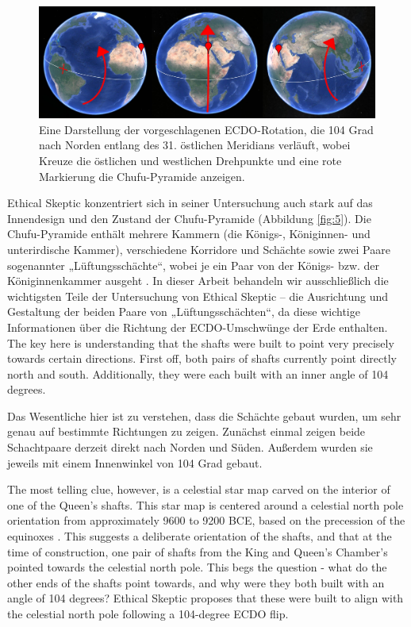 \documentclass[10pt,twocolumn,letterpaper]{article}
\begin{document}
\begin{figure}[b]
\begin{center}
\includegraphics[width=1\textwidth]{drawing.jpg}
\end{center}
   \caption{Eine Darstellung der vorgeschlagenen ECDO-Rotation, die 104 Grad nach Norden entlang des 31. östlichen Meridians verläuft, wobei Kreuze die östlichen und westlichen Drehpunkte und eine rote Markierung die Chufu-Pyramide anzeigen.}
\label{fig:6}
\end{figure}

Ethical Skeptic konzentriert sich in seiner Untersuchung \cite{28} auch stark auf das Innendesign und den Zustand der Chufu-Pyramide (Abbildung \ref{fig:5}). Die Chufu-Pyramide enthält mehrere Kammern (die Königs-, Königinnen- und unterirdische Kammer), verschiedene Korridore und Schächte sowie zwei Paare sogenannter „Lüftungsschächte“, wobei je ein Paar von der Königs- bzw. der Königinnenkammer ausgeht \cite{29,30}. In dieser Arbeit behandeln wir ausschließlich die wichtigsten Teile der Untersuchung von Ethical Skeptic – die Ausrichtung und Gestaltung der beiden Paare von „Lüftungsschächten“, da diese wichtige Informationen über die Richtung der ECDO-Umschwünge der Erde enthalten.
The key here is understanding that the shafts were built to point very precisely towards certain directions. First off, both pairs of shafts currently point directly north and south. Additionally, they were each built with an inner angle of 104 degrees.

Das Wesentliche hier ist zu verstehen, dass die Schächte gebaut wurden, um sehr genau auf bestimmte Richtungen zu zeigen. Zunächst einmal zeigen beide Schachtpaare derzeit direkt nach Norden und Süden. Außerdem wurden sie jeweils mit einem Innenwinkel von 104 Grad gebaut.

The most telling clue, however, is a celestial star map carved on the interior of one of the Queen's shafts. This star map is centered around a celestial north pole orientation from approximately 9600 to 9200 BCE, based on the precession of the equinoxes \cite{28}. This suggests a deliberate orientation of the shafts, and that at the time of construction, one pair of shafts from the King and Queen's Chamber's pointed towards the celestial north pole. This begs the question - what do the other ends of the shafts point towards, and why were they both built with an angle of 104 degrees? Ethical Skeptic proposes that these were built to align with the celestial north pole following a 104-degree ECDO flip.
\end{document}
